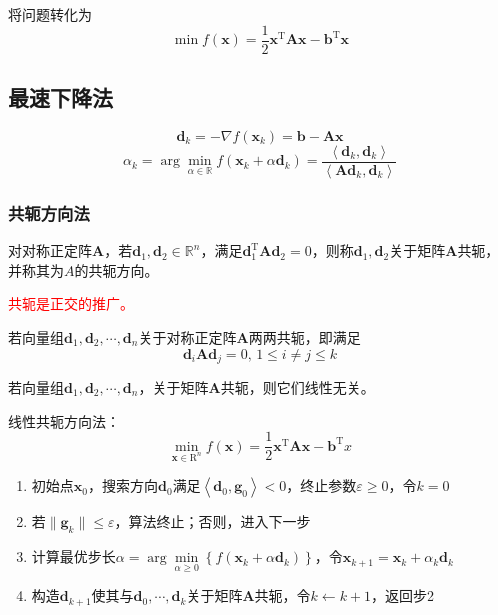将问题转化为
\[
    \min f(\boldsymbol{x}) = \dfrac{1}{2}\boldsymbol{x}^{\mathrm{T}}\boldsymbol{Ax}-\boldsymbol{b}^{\mathrm{T}}\boldsymbol{x}
\]
\subsection{最速下降法}
\[
    \boldsymbol{d}_{k} = -\nabla f(\boldsymbol{x}_{k}) = \boldsymbol{b}-\boldsymbol{Ax}
\]
\[
    \alpha_{k} = \arg\min\limits_{\alpha\in \mathbb{R}}f(\boldsymbol{x}_{k}+\alpha \boldsymbol{d}_{k}) = \frac{\left<\boldsymbol{d}_{k},\boldsymbol{d}_{k}\right>}{\left<\boldsymbol{Ad}_{k},\boldsymbol{d}_{k}\right>}
\]
\subsubsection{共轭方向法}
\begin{definition}[共轭方向]
    对对称正定阵$\boldsymbol{A}$，若$\boldsymbol{d}_1,\boldsymbol{d}_2\in\mathbb{R}^n$，满足$\boldsymbol{d}_{1}^{\mathrm{T}}\boldsymbol{Ad}_2 = 0$，则称$\boldsymbol{d}_1,\boldsymbol{d}_2$关于矩阵$\boldsymbol{A}$共轭，并称其为$A$的共轭方向。

    \textcolor{red}{共轭是正交的推广。}
\end{definition}

\begin{definition}[线性共轭方向的推广]
    若向量组$\boldsymbol{d}_1,\boldsymbol{d}_2,\cdots,\boldsymbol{d}_n$关于对称正定阵$\boldsymbol{A}$两两共轭，即满足
    \[
        \boldsymbol{d}_i\boldsymbol{A}\boldsymbol{d}_j  = 0,\,1\leqslant i\neq j\leqslant k
    \]
\end{definition}
\begin{corollary}
    若向量组$\boldsymbol{d}_1,\boldsymbol{d}_2,\cdots,\boldsymbol{d}_n$，关于矩阵$\boldsymbol{A}$共轭，则它们线性无关。
\end{corollary}

\begin{note}
    线性共轭方向法：
    \[
    \min\limits_{\boldsymbol{x}\in\mathrm{R}^n} f(\boldsymbol{x}) = \dfrac{1}{2}\boldsymbol{x}^{\mathrm{T}}\boldsymbol{Ax}-\boldsymbol{b}^{\mathrm{T}}x
    \]
    \begin{enumerate}
        \item 初始点$\boldsymbol{x}_0$，搜索方向$\boldsymbol{d}_0$满足$\left< \boldsymbol{d}_0,\boldsymbol{g}_0 \right><0$，终止参数$\varepsilon\geqslant 0$，令$k=0$
        \item 若$\|\boldsymbol{g}_k\|\leqslant \varepsilon$，算法终止；否则，进入下一步
        \item 计算最优步长$\alpha = \arg\min\limits_{\alpha\geqslant 0}\left\{ f(\boldsymbol{x}_k+\alpha \boldsymbol{d}_{k}) \right\}$，令$\boldsymbol{x}_{k+1} = \boldsymbol{x}_k+\alpha_k\boldsymbol{d}_k$
        \item 构造$\boldsymbol{d}_{k+1}$使其与$\boldsymbol{d}_0,\cdots,\boldsymbol{d}_k$关于矩阵$\boldsymbol{A}$共轭，令$k \gets k+1$，返回步2
    \end{enumerate}
\end{note}


